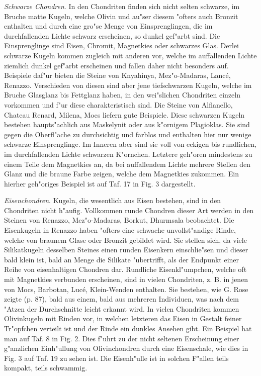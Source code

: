 \documentclass[a4paper, 11pt, oneside, polutonikogreek, german]{article}
\begin{document}
\emph{Schwarze Chondren}. In den Chondriten finden sich nicht selten schwarze, im Bruche matte Kugeln, welche Olivin und au"ser diesem "ofters auch Bronzit enthalten und durch eine gro"se Menge von Einsprenglingen, die im durchfallenden Lichte schwarz erscheinen, so dunkel gef"arbt sind. Die Einsprenglinge sind Eisen, Chromit, Magnetkies oder schwarzes Glas. Derlei schwarze Kugeln kommen zugleich mit anderen vor, welche im auffallenden Lichte ziemlich dunkel gef"arbt erscheinen und fallen daher nicht besonders auf. Beispiele daf"ur bieten die Steine von Knyahinya, Mez"o-Madaras, Lancé, Renazzo. Verschieden von diesen sind aber jene tiefschwarzen Kugeln, welche im Bruche Glasglanz bis Fettglanz haben, in den wei"slichen Chondriten einzeln vorkommen und f"ur diese charakteristisch sind. Die Steine von Alfianello, Chateau Renard, Milena, Mocs liefern gute Beispiele. Diese schwarzen Kugeln bestehen haupts"achlich aus Maskelynit oder aus k"ornigem Plagioklas. Sie sind gegen die Oberfl"ache zu durchsichtig und farblos und enthalten hier nur wenige schwarze Einsprenglinge. Im Inneren aber sind sie voll von eckigen bis rundlichen, im durchfallenden Lichte schwarzen K"ornchen. Letztere geh"oren mindestens zu einem Teile dem Magnetkies an, da bei auffallendem Lichte mehrere Stellen den Glanz und die braune Farbe zeigen, welche dem Magnetkies zukommen. Ein hierher geh"origes Beispiel ist auf Taf. 17 in Fig. 3 dargestellt.

\emph{Eisenchondren}. Kugeln, die wesentlich aus Eisen bestehen, sind in den Chondriten nicht h"aufig. Vollkommen runde Chondren dieser Art werden in den Steinen von Renazzo, Mez"o-Madaras, Borkut, Dhurmsala beobachtet. Die Eisenkugeln in Renazzo haben "ofters eine schwache unvollst"andige Rinde, welche von braunem Glase oder Bronzit gebildet wird. Sie stellen sich, da viele Silikatkugeln desselben Steines einen runden Eisenkern einschlie"sen und dieser bald klein ist, bald an Menge die Silikate "ubertrifft, als der Endpunkt einer Reihe von eisenhaltigen Chondren dar. Rundliche Eisenkl"umpchen, welche oft mit Magnetkies verbunden erscheinen, sind in vielen Chondriten, z. B. in jenen von Mocs, Barbotan, Lucé, Klein-Wenden enthalten. Sie bestehen, wie G. Rose zeigte (p. 87), bald aus einem, bald aus mehreren Individuen, was nach dem "Atzen der Durchschnitte leicht erkannt wird. In vielen Chondriten kommen Olivinkugeln mit Rinden vor, in welchen letzteren das Eisen in Gestalt feiner Tr"opfchen verteilt ist und der Rinde ein dunkles Ansehen gibt. Ein Beispiel hat man auf Taf. 8 in Fig. 2. Dies f"uhrt zu der nicht seltenen Erscheinung einer g"anzlichen Einh"ullung von Olivinchondren durch eine Eisenschale, wie dies in Fig. 3 auf Taf. 19 zu sehen ist. Die Eisenh"ulle ist in solchen F"allen teils kompakt, teils schwammig.
\end{document}
